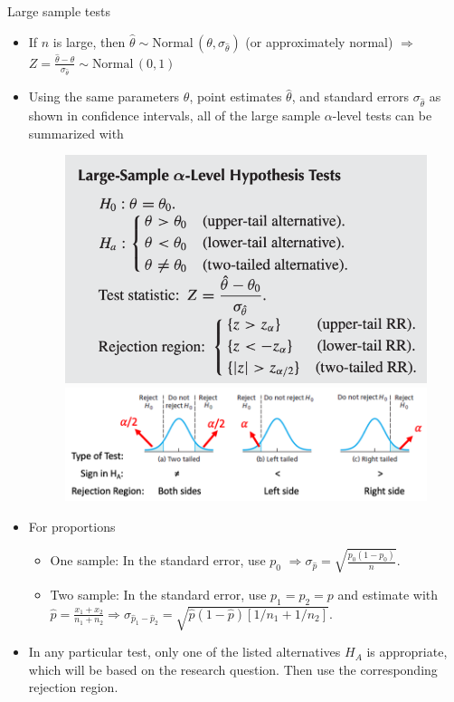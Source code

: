 \documentclass{article}
\newcommand{\follow}[1]{\sim \text{#1}\,}		%
\newcommand{\ha}{H_A}		%
\begin{document}
Large sample tests
\begin{itemize}
    \item If $n$ is large, then $\hat{\theta} \follow{Normal}(\theta, \sigma_{\hat{\theta}})$ (or approximately normal) $\Longrightarrow$ $Z = \frac{\hat{\theta} - \theta}{\sigma_{\hat{\theta}}} \follow{Normal}(0,1)$
    \item Using the same parameters $\theta$, point estimates $\hat{\theta}$, and standard errors $\sigma_{\hat{\theta}}$ as shown in confidence intervals, all of the large sample $\alpha$-level tests can be summarized with
    \begin{figure}[H]
    \begin{minipage}{0.45\textwidth}
        \center\includegraphics[scale=0.5]{images/large-sample-tests-summary.png}
    \end{minipage}
    \begin{minipage}{0.4\textwidth}
        \center\includegraphics[scale=0.4]{images/rr.png}
    \end{minipage}
    \end{figure}
    \item For proportions
    \begin{itemize}
        \item One sample: In the standard error, use $p_0$ $\Longrightarrow \displaystyle \sigma_{\hat{p}} = \sqrt{\frac{p_0 (1 - p_0)}{n}}$.
        \item Two sample: In the standard error, use $p_1 = p_2 = p$ and estimate with \\$\displaystyle \hat{p} = \frac{x_1 + x_2}{n_1 + n_2} \Longrightarrow \sigma_{\hat{p}_1 - \hat{p}_2} = \sqrt{\hat{p} (1 - \hat{p}) [1 / n_1 + 1 / n_2]}$.
    \end{itemize}\newpage
    \item In any particular test, only one of the listed alternatives $\ha$ is appropriate, which will be based on the research question. Then use the corresponding rejection region.
\end{itemize}\bigskip
\end{document}
